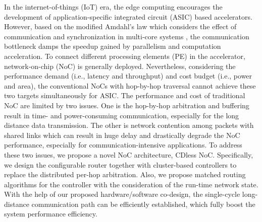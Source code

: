 \indent In the internet-of-things (IoT) era, the edge computing encourages the development of application-specific integrated circuit (ASIC) based accelerators. However, based on the modified Amdahl's law which considers the effect of communication and synchronization in multi-core systems \cite{yavits2014effect}, the communication bottleneck damps the speedup gained by parallelism and computation acceleration. To connect different processing elements (PE) in the accelerator, network-on-chip (NoC) is generally deployed. Nevertheless, considering the performance demand (i.e., latency and throughput) and cost budget (i.e., power and area), the conventional NoCs with hop-by-hop traversal cannot achieve these two targets simultaneously for ASIC. 
The performance and cost of traditional NoC are limited by two issues. One is the hop-by-hop arbitration and buffering result in time- and power-consuming communication, especially for the long distance data transmission.
The other is network contention among packets with shared links which can result in huge delay and drastically degrade the NoC performance, especially for communication-intensive applications.
To address these two issues, we propose a novel NoC architecture, CDless NoC. Specifically, we design the configurable router together with cluster-based controllers to replace the distributed per-hop arbitration. Also, we propose matched routing algorithms for the controller with the consideration of the run-time network state. With the help of our proposed hardware/software co-design, the single-cycle long-distance communication path can be efficiently established, which fully boost the system performance efficiency.
